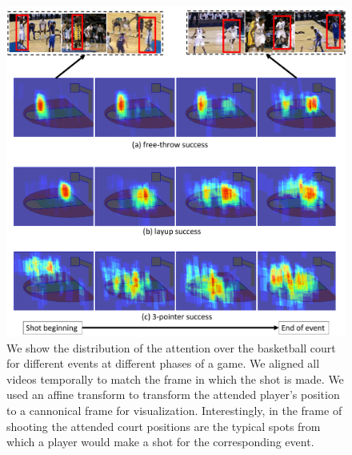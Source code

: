 \begin{figure}[t!]
\begin{center}
  \includegraphics[width=7 in]{images/heatmap_figure_cropped.pdf}
\end{center}
   \caption{We show the distribution of the attention over the basketball court
     for different events at different phases of a game.  We aligned all videos
     temporally to match the frame in which the shot is made.  We used an
     affine transform to transform the attended player's position to a
     cannonical frame for visualization.  Interestingly, in the frame of
     shooting the attended court positions are the typical spots from which a
     player would make a shot for the corresponding event.
   }
\label{fig:att_heatmap}
\end{figure}


